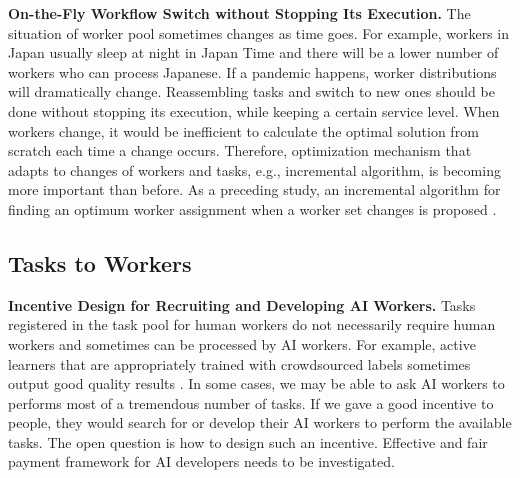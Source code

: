 \noindent
{\bf On-the-Fly Workflow Switch without Stopping Its Execution.}
The situation of worker pool sometimes changes as time goes. For example, workers in Japan usually sleep at night in Japan Time and there will be a lower number of workers who can process Japanese. If a pandemic happens, worker distributions will dramatically change. Reassembling  tasks and switch to new ones should be done without stopping its execution, while keeping a certain service level.
 When workers change, it would be inefficient to calculate the optimal solution from scratch each time a change occurs. Therefore, optimization mechanism that adapts to changes of workers and tasks, e.g., incremental algorithm, is becoming more important than before.
As a preceding study, an incremental algorithm for finding an optimum worker assignment when a worker set changes is proposed
\cite{RLT+15}.




\subsection{Tasks to Workers}
{\bf Incentive Design for Recruiting and Developing AI Workers.}
Tasks registered in the task pool  for human workers do not necessarily require human workers and sometimes can be processed by AI workers. For example, active learners that are appropriately trained with crowdsourced labels sometimes output good quality results \cite{YRF+11}. In some cases, we may be able to ask AI workers to performs most of a tremendous number of tasks. If we gave a good incentive to people, they would search for or develop their AI workers to perform the available tasks. The open question is how to design such an incentive.
Effective and fair payment framework for AI developers needs to be investigated.

